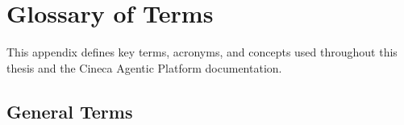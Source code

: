 
\chapter{Glossary of Terms}
\label{app:glossary}

This appendix defines key terms, acronyms, and concepts used throughout this thesis and the Cineca Agentic Platform documentation.

\section{General Terms}
\label{app:glossary:general}

